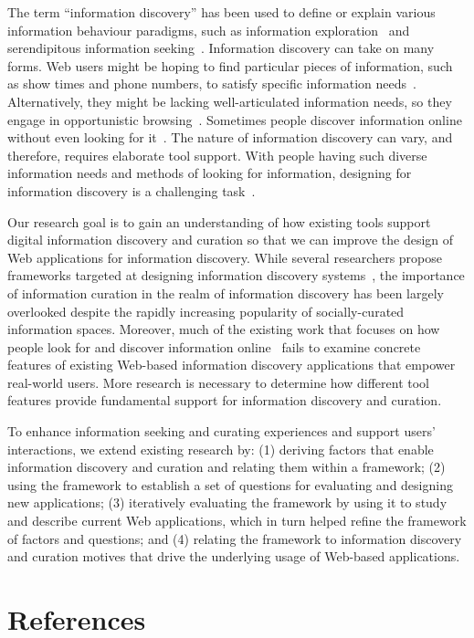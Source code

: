 \documentclass[review]{elsarticle}
\begin{document}
The term ``information discovery'' has been used to define or explain various information behaviour paradigms, such as information exploration~\cite{waterworth1991model} and serendipitous information seeking~\cite{foster2003serendipity}.  
Information discovery can take on many forms. Web users might be hoping to find particular pieces of information, such as show times and phone numbers, to satisfy specific information needs~\cite{proper1999information}. Alternatively, they might be lacking well-articulated information needs, so they engage in opportunistic browsing~\cite{lindley2012s}. Sometimes people discover information online without even looking for it~\cite{bates1986exploratory}. The nature of information discovery can vary, and therefore, requires elaborate tool support. With people having such diverse information needs and methods of looking for information, designing for information discovery is a challenging task~\cite{conaway2010designing, marchionini2006exploratory}.

Our research goal is to gain an understanding of how existing tools support digital information discovery and curation so that we can improve the design of Web applications for information discovery. While several researchers propose frameworks targeted at designing information discovery systems~\cite{proper1999information, kerne2004information}, the importance of information curation in the realm of information discovery has been largely overlooked despite the rapidly increasing popularity of socially-curated information spaces. Moreover, much of the existing work that focuses on how people look for and discover information online~\cite{bates1986exploratory, choo2000information, ellis1989behavioural, kellar2006goal, lindley2012s, morrison2001taxonomic, sellen2002knowledge} fails to examine concrete features of existing Web-based information discovery applications that empower real-world users. More research is necessary to determine how different tool features provide fundamental support for information discovery and curation.

To enhance information seeking and curating experiences and support users' interactions, we extend existing research by: (1) deriving factors that enable information discovery and curation and relating them within a framework; (2) using the framework to establish a set of questions for evaluating and designing new applications; (3) iteratively evaluating the framework by using it to study and describe current Web applications, which in turn helped refine the framework of factors and questions; and (4) relating the framework to information discovery and curation motives that drive the underlying usage of Web-based applications.



\section*{References}


\end{document}
